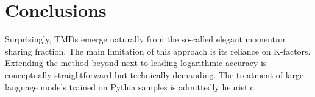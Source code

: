 \section{Conclusions}\label{sec:conclusions}

Surprisingly, TMDs emerge naturally from the so-called elegant momentum
sharing fraction. The main limitation of this approach is its reliance
on K-factors. Extending the method beyond next-to-leading logarithmic
accuracy is conceptually straightforward but technically demanding. The
treatment of large language models trained on Pythia samples is
admittedly heuristic.

